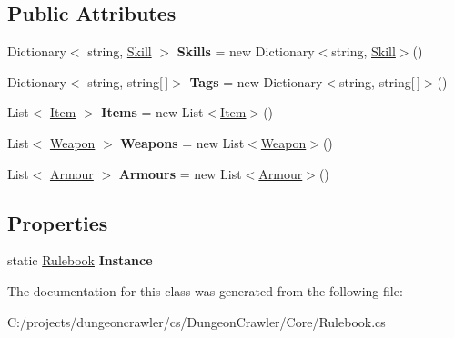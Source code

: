 \subsection*{Public Attributes}
\begin{DoxyCompactItemize}
\item 
\hypertarget{class_dungeon_crawler_1_1_core_1_1_rulebook_afff9e91efa6e6581f7b02b4baeb5e756}{}Dictionary$<$ string, \hyperlink{class_dungeon_crawler_1_1_core_1_1_skill}{Skill} $>$ {\bfseries Skills} = new Dictionary$<$string, \hyperlink{class_dungeon_crawler_1_1_core_1_1_skill}{Skill}$>$()\label{class_dungeon_crawler_1_1_core_1_1_rulebook_afff9e91efa6e6581f7b02b4baeb5e756}

\item 
\hypertarget{class_dungeon_crawler_1_1_core_1_1_rulebook_acd5fb3739084cde354ae4d729354fbe3}{}Dictionary$<$ string, string\mbox{[}$\,$\mbox{]}$>$ {\bfseries Tags} = new Dictionary$<$string, string\mbox{[}$\,$\mbox{]}$>$()\label{class_dungeon_crawler_1_1_core_1_1_rulebook_acd5fb3739084cde354ae4d729354fbe3}

\item 
\hypertarget{class_dungeon_crawler_1_1_core_1_1_rulebook_a56af8e1641ddce45fa078dade8aec12e}{}List$<$ \hyperlink{class_dungeon_crawler_1_1_core_1_1_item}{Item} $>$ {\bfseries Items} = new List$<$\hyperlink{class_dungeon_crawler_1_1_core_1_1_item}{Item}$>$()\label{class_dungeon_crawler_1_1_core_1_1_rulebook_a56af8e1641ddce45fa078dade8aec12e}

\item 
\hypertarget{class_dungeon_crawler_1_1_core_1_1_rulebook_a636bdadcc92b81c2f8d427bce718128f}{}List$<$ \hyperlink{class_dungeon_crawler_1_1_core_1_1_weapon}{Weapon} $>$ {\bfseries Weapons} = new List$<$\hyperlink{class_dungeon_crawler_1_1_core_1_1_weapon}{Weapon}$>$()\label{class_dungeon_crawler_1_1_core_1_1_rulebook_a636bdadcc92b81c2f8d427bce718128f}

\item 
\hypertarget{class_dungeon_crawler_1_1_core_1_1_rulebook_a4885fa840e4fb2bdc585aa1d9f135169}{}List$<$ \hyperlink{class_dungeon_crawler_1_1_core_1_1_armour}{Armour} $>$ {\bfseries Armours} = new List$<$\hyperlink{class_dungeon_crawler_1_1_core_1_1_armour}{Armour}$>$()\label{class_dungeon_crawler_1_1_core_1_1_rulebook_a4885fa840e4fb2bdc585aa1d9f135169}

\end{DoxyCompactItemize}
\subsection*{Properties}
\begin{DoxyCompactItemize}
\item 
\hypertarget{class_dungeon_crawler_1_1_core_1_1_rulebook_a113e93268afaa03eb3d7c0ce9ef284e7}{}static \hyperlink{class_dungeon_crawler_1_1_core_1_1_rulebook}{Rulebook} {\bfseries Instance}\label{class_dungeon_crawler_1_1_core_1_1_rulebook_a113e93268afaa03eb3d7c0ce9ef284e7}

\end{DoxyCompactItemize}


The documentation for this class was generated from the following file\+:\begin{DoxyCompactItemize}
\item 
C\+:/projects/dungeoncrawler/cs/\+Dungeon\+Crawler/\+Core/Rulebook.\+cs\end{DoxyCompactItemize}

